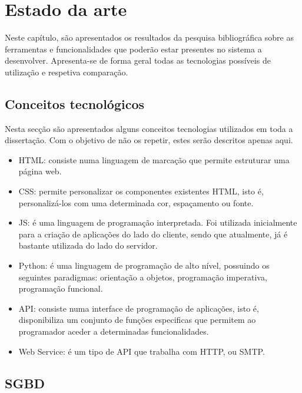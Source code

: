 \chapter{Estado da arte}
\label{state}


Neste capítulo, são apresentados os resultados da pesquisa bibliográfica sobre as ferramentas e funcionalidades que poderão estar presentes no sistema a desenvolver. Apresenta-se de forma geral todas as tecnologias possíveis de utilização e respetiva comparação. 






\section{Conceitos tecnológicos}


Nesta secção são apresentados alguns conceitos tecnologias utilizados em toda a dissertação. Com o objetivo de não os repetir, estes serão descritos apenas aqui. 

\begin{itemize}
	\item \ac{HTML}: consiste numa linguagem de marcação que permite estruturar uma página web. 
	\item \ac{CSS}: permite personalizar os componentes existentes \ac{HTML}, isto é, personalizá-los com uma determinada cor, espaçamento ou fonte. 
	\item \ac{JS}: é uma linguagem de programação interpretada. Foi utilizada inicialmente para a criação de aplicações do lado do cliente, sendo que atualmente, já é bastante utilizada do lado do servidor. 
	
	\item Python: é uma  linguagem de programação de alto nível, possuindo os seguintes paradigmas:  orientação a objetos, programação imperativa, programação funcional. 
	
	
	\item \ac{API}: consiste numa interface de programação de aplicações, isto é, disponibiliza um conjunto de funções especificas que permitem ao programador aceder a determinadas funcionalidades.  
	
	\item Web Service: é um tipo de \ac{API} que trabalha com \ac{HTTP},
	ou \ac{SMTP}.
	
	
\end{itemize}



\section{\acl{SGBD}}

